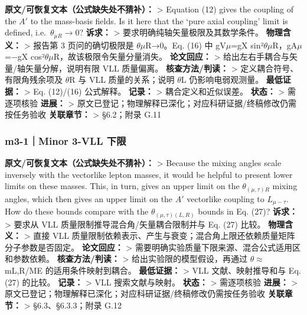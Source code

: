 \documentclass[
  chinese,
  UTF8]{ctexart}
\begin{document}
\textbf{原文/可恢复文本（公式缺失处不猜补）：} \textgreater{} Equation
(12) gives the coupling of the \(A'\) to the mass-basis fields. Is it
here that the `pure axial coupling' limit is defined,
i.e.~\(\theta_{\mu R}\to0\)? \textbf{诉求：} \textgreater{}
要求明确纯轴矢量极限及其数学条件。 \textbf{物理含义：} \textgreater{}
报告第 3 页问的确切极限是 \ensuremath{\theta}\ensuremath{\mu}R→0。Eq.
(16) 中 gV\ensuremath{\mu}=gX
sin²\ensuremath{\theta}\ensuremath{\mu}R，gA\ensuremath{\mu}=−gX
cos²\ensuremath{\theta}\ensuremath{\mu}R，故该极限令矢量分量消失。
\textbf{论文回应：} \textgreater{}
给出左右手耦合与矢量/轴矢量分解，说明有限 VLL 质量偏离。
\textbf{核查方法/判读：} \textgreater{} 定义耦合符号、有限角残余项及
\ensuremath{\theta}R 与 VLL 质量的关系；说明 \ensuremath{\theta}L
仍影响电弱观测量。 \textbf{最低证据：} \textgreater{} Eq. (12)/(16)
公式解释。 \textbf{记录：} \textgreater{} 耦合定义和近似误差。
\textbf{状态：} \textgreater{} 需逐项核验 \textbf{进展：} \textgreater{}
原文已登记；物理解释已深化；对应科研证据/终稿修改仍需按任务验收
\textbf{关联章节：} \textgreater{} §6.2；附录 G.11

\subsubsection{m3-1｜Minor 3-VLL
下限}\label{m3-1minor-3-vll-ux4e0bux9650}

\textbf{原文/可恢复文本（公式缺失处不猜补）：} \textgreater{} Because
the mixing angles scale inversely with the vectorlike lepton masses, it
would be helpful to present lower limits on these masses. This, in turn,
gives an upper limit on the \(\theta_{(\mu,\tau)R}\) mixing angles,
which then gives an upper limit on the \(A'\) vectorlike coupling to
\(L_{\mu-\tau}\). How do these bounds compare with the
\(\theta_{(\mu,\tau)(L,R)}\) bounds in Eq. (27)? \textbf{诉求：}
\textgreater{} 要求从 VLL 质量限制推导混合角/矢量耦合限制并与 Eq. (27)
比较。 \textbf{物理含义：} \textgreater{} 直接 VLL
质量限制依赖表示、产生与衰变；混合角上限还依赖质量矩阵分子参数是否固定。
\textbf{论文回应：} \textgreater{}
需要明确实验质量下限来源、混合公式适用区和参数依赖。
\textbf{核查方法/判读：} \textgreater{} 给出实验限的模型假设，再通过
\ensuremath{\theta}\ensuremath{\approx}mL,R/ME 的适用条件映射到耦合。
\textbf{最低证据：} \textgreater{} VLL 文献、映射推导和与 Eq. (27)
的比较。 \textbf{记录：} \textgreater{} VLL 搜索文献与映射。
\textbf{状态：} \textgreater{} 需逐项核验 \textbf{进展：} \textgreater{}
原文已登记；物理解释已深化；对应科研证据/终稿修改仍需按任务验收
\textbf{关联章节：} \textgreater{} §6.3、§6.3.3；附录 G.12
\end{document}
